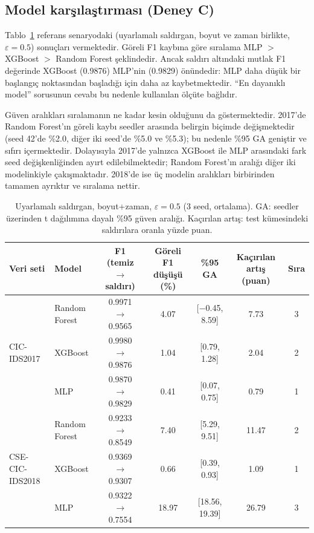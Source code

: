 \documentclass[conference]{IEEEtran}
\begin{document}
\subsection{Model karşılaştırması (Deney C)}
Tablo~\ref{tab:robust} referans senaryodaki (uyarlamalı saldırgan, boyut ve zaman birlikte, $\varepsilon=0.5$) sonuçları vermektedir. Göreli F1 kaybına göre sıralama MLP $>$ XGBoost $>$ Random Forest şeklindedir. Ancak saldırı altındaki mutlak F1 değerinde XGBoost (0.9876) MLP'nin (0.9829) önündedir: MLP daha düşük bir başlangıç noktasından başladığı için daha az kaybetmektedir. ``En dayanıklı model'' sorusunun cevabı bu nedenle kullanılan ölçüte bağlıdır.

Güven aralıkları sıralamanın ne kadar kesin olduğunu da göstermektedir. 2017'de Random Forest'ın göreli kaybı seedler arasında belirgin biçimde değişmektedir (seed 42'de \%2.0, diğer iki seed'de \%5.0 ve \%5.3); bu nedenle \%95 GA geniştir ve sıfırı içermektedir. Dolayısıyla 2017'de yalnızca XGBoost ile MLP arasındaki fark seed değişkenliğinden ayırt edilebilmektedir; Random Forest'ın aralığı diğer iki modelinkiyle çakışmaktadır. 2018'de ise üç modelin aralıkları birbirinden tamamen ayrıktır ve sıralama nettir.

\begin{table}[t]
\caption{Uyarlamalı saldırgan, boyut+zaman, $\varepsilon = 0.5$ (3 seed, ortalama). GA: seedler üzerinden t dağılımına dayalı \%95 güven aralığı. Kaçırılan artış: test kümesindeki saldırılara oranla yüzde puan.}
\label{tab:robust}
\centering
\small
\begin{tabular}{llccccc}
\toprule
Veri seti & Model & F1 (temiz $\rightarrow$ saldırı) & Göreli F1 düşüşü (\%) & \%95 GA & Kaçırılan artış (puan) & Sıra \\
\midrule
\multirow{3}{*}{CIC-IDS2017} & Random Forest & 0.9971 $\rightarrow$ 0.9565 & 4.07 & [$-$0.45, 8.59] & 7.73 & 3 \\
 & XGBoost & 0.9980 $\rightarrow$ 0.9876 & 1.04 & [0.79, 1.28] & 2.04 & 2 \\
 & MLP & 0.9870 $\rightarrow$ 0.9829 & 0.41 & [0.07, 0.75] & 0.79 & 1 \\
\midrule
\multirow{3}{*}{CSE-CIC-IDS2018} & Random Forest & 0.9233 $\rightarrow$ 0.8549 & 7.40 & [5.29, 9.51] & 11.47 & 2 \\
 & XGBoost & 0.9369 $\rightarrow$ 0.9307 & 0.66 & [0.39, 0.93] & 1.09 & 1 \\
 & MLP & 0.9322 $\rightarrow$ 0.7554 & 18.97 & [18.56, 19.39] & 26.79 & 3 \\
\bottomrule
\end{tabular}
\end{table}
\end{document}

